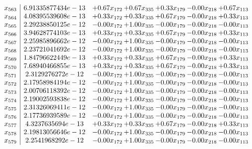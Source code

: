 \documentclass[8pt]{article}
\begin{document}
\[\begin{array}{c| c c@{\hskip 2pt} c@{\hskip 2pt} c@{\hskip 2pt} c@{\hskip 2pt} c@{\hskip 2pt} }
 x_{563}   &  6.91335877434e-13 & +  0.67 x_{172} & +  0.67 x_{335} & +  0.33 x_{179} & -0.00 x_{218} & +  0.67 x_{113}\\
 x_{564}   &  4.08395539608e-13 & +  0.33 x_{172} & +  0.33 x_{335} & +  0.67 x_{179} & -0.00 x_{218} & +  0.33 x_{113}\\
 x_{565}   &  2.29238850125e-12 & -0.00 x_{172} & +  1.00 x_{335} & -0.00 x_{179} & -0.00 x_{218} & -0.00 x_{113}\\
 x_{566}   &  3.94628774103e-13 & +  0.33 x_{172} & +  0.33 x_{335} & +  0.67 x_{179} & -0.00 x_{218} & +  0.33 x_{113}\\
 x_{567}   &  2.25985896662e-12 & -0.00 x_{172} & +  1.00 x_{335} & -0.00 x_{179} & -0.00 x_{218} & -0.00 x_{113}\\
 x_{568}   &  2.23721041692e-12 & -0.00 x_{172} & +  1.00 x_{335} & -0.00 x_{179} & -0.00 x_{218} & -0.00 x_{113}\\
 x_{569}   &  1.84796622449e-13 & +  0.33 x_{172} & +  0.33 x_{335} & +  0.67 x_{179} & -0.00 x_{218} & +  0.33 x_{113}\\
 x_{570}   &  7.68940466855e-13 & +  0.33 x_{172} & +  0.33 x_{335} & +  0.67 x_{179} & -0.00 x_{218} & +  0.33 x_{113}\\
 x_{571}   &  2.3129276272e-12 & -0.00 x_{172} & +  1.00 x_{335} & -0.00 x_{179} & -0.00 x_{218} & -0.00 x_{113}\\
 x_{572}   &  2.17958984194e-12 & -0.00 x_{172} & +  1.00 x_{335} & -0.00 x_{179} & -0.00 x_{218} & -0.00 x_{113}\\
 x_{573}   &  2.00706118392e-12 & -0.00 x_{172} & +  1.00 x_{335} & -0.00 x_{179} & -0.00 x_{218} & -0.00 x_{113}\\
 x_{574}   &  2.19002593838e-12 & -0.00 x_{172} & +  1.00 x_{335} & -0.00 x_{179} & -0.00 x_{218} & -0.00 x_{113}\\
 x_{575}   &  2.31326069411e-12 & -0.00 x_{172} & +  1.00 x_{335} & -0.00 x_{179} & -0.00 x_{218} & -0.00 x_{113}\\
 x_{576}   &  2.17736939589e-12 & -0.00 x_{172} & +  1.00 x_{335} & -0.00 x_{179} & -0.00 x_{218} & -0.00 x_{113}\\
 x_{577}   &  4.3237635694e-13 & +  0.33 x_{172} & +  0.33 x_{335} & +  0.67 x_{179} & -0.00 x_{218} & +  0.33 x_{113}\\
 x_{578}   &  2.19813056646e-12 & -0.00 x_{172} & +  1.00 x_{335} & -0.00 x_{179} & -0.00 x_{218} & -0.00 x_{113}\\
 x_{579}   &  2.2541968292e-12 & -0.00 x_{172} & +  1.00 x_{335} & -0.00 x_{179} & -0.00 x_{218} & -0.00 x_{113}\\

\end{array}\]
\end{document}
